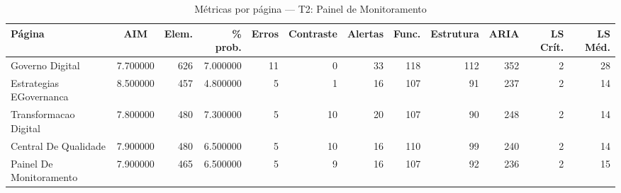 \begin{table}[htbp]
  \centering
  \caption{Métricas por página — T2: Painel de Monitoramento}
  \label{tab:flow_t2_painel_de_monitoramento}
  \small
  \begin{tabular}{lcrrrrrrrrrr}
\toprule
Página & AIM & Elem. & \% prob. & Erros & Contraste & Alertas & Func. & Estrutura & ARIA & LS Crít. & LS Méd. \\
\midrule
Governo Digital & 7.700000 & 626 & 7.000000 & 11 & 0 & 33 & 118 & 112 & 352 & 2 & 28 \\
Estrategias EGovernanca & 8.500000 & 457 & 4.800000 & 5 & 1 & 16 & 107 & 91 & 237 & 2 & 14 \\
Transformacao Digital & 7.800000 & 480 & 7.300000 & 5 & 10 & 20 & 107 & 90 & 248 & 2 & 14 \\
Central De Qualidade & 7.900000 & 480 & 6.500000 & 5 & 10 & 16 & 110 & 99 & 240 & 2 & 14 \\
Painel De Monitoramento & 7.900000 & 465 & 6.500000 & 5 & 9 & 16 & 107 & 92 & 236 & 2 & 15 \\
\bottomrule
\end{tabular}
\end{table}
